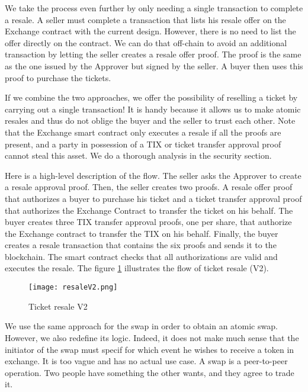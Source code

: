 \documentclass[a4paper,11pt,oneside]{report}
\begin{document}
We take the process even further by only needing a single transaction to complete a resale. A seller must complete a transaction that lists his resale offer on the Exchange contract with the current design. However, there is no need to list the offer directly on the contract. We can do that off-chain to avoid an additional transaction by letting the seller creates a resale offer proof. The proof is the same as the one issued by the Approver but signed by the seller. A buyer then uses this proof to purchase the tickets.

If we combine the two approaches, we offer the possibility of reselling a ticket by carrying out a single transaction! It is handy because it allows us to make atomic resales and thus do not oblige the buyer and the seller to trust each other. Note that the Exchange smart contract only executes a resale if all the proofs are present, and a party in possession of a TIX or ticket transfer approval proof cannot steal this asset. We do a thorough analysis in the security section.

Here is a high-level description of the flow. The seller asks the Approver to create a resale approval proof. Then, the seller creates two proofs. A resale offer proof that authorizes a buyer to purchase his ticket and a ticket transfer approval proof that authorizes the Exchange Contract to transfer the ticket on his behalf. The buyer creates three TIX transfer approval proofs, one per share, that authorize the Exchange contract to transfer the TIX on his behalf. Finally, the buyer creates a resale transaction that contains the six proofs and sends it to the blockchain. The smart contract checks that all authorizations are valid and executes the resale. The figure \hyperref[fig:resaleV2]{\ref{fig:resaleV2}} illustrates the flow of ticket resale (V2).

\begin{figure}[h!]
  \texttt{[image: resaleV2.png]}
  \caption{Ticket resale V2}
  \label{fig:resaleV2}
\end{figure}

We use the same approach for the swap in order to obtain an atomic swap. However, we also redefine its logic. Indeed, it does not make much sense that the initiator of the swap must specif for which event he wishes to receive a token in exchange. It is too vague and has no actual use case. A swap is a peer-to-peer operation. Two people have something the other wants, and they agree to trade it. 
\end{document}
